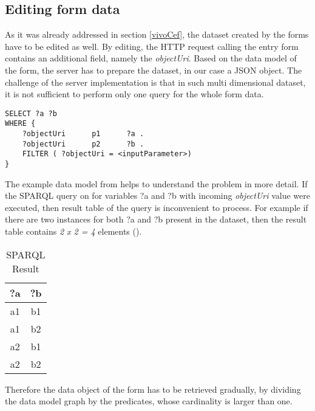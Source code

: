 \subsection{Editing form data}
	
As it was already addressed in section \ref{vivoCef}, the dataset created by the forms have to be edited as well. By editing, the HTTP request calling the entry form contains an additional field, namely the \textit{objectUri}. Based on the data model of the form, the server has to prepare the dataset, in our case a JSON object. The challenge of the server implementation is that in such multi dimensional dataset, it is not sufficient to perform only one query for the whole form data.


\begin{lstlisting}[captionpos=b, caption=SPARQL query for the form data, label={sparqlExisting},
basicstyle=\footnotesize,frame=single]
SELECT ?a ?b
WHERE {
	?objectUri		p1		?a .
	?objectUri		p2		?b .
	FILTER ( ?objectUri = <inputParameter>)
}
\end{lstlisting}

The example data model from  helps to understand the problem in more detail. If the SPARQL query on  for variables ?a and ?b with incoming \textit{objectUri} value were executed, then result table of the query is inconvenient to process. For example if there are two instances for both ?a and ?b present in the dataset, then the result table contains \textit{2 x 2 = 4} elements ().

\begin{table}

	\begin{center}
		\begin{tabular}{||c | c||} 
			\hline
			?a & ?b  \\ [0.5ex] 
			\hline\hline
			a1 & b1 \\ 
			\hline
			a1 & b2 \\
			\hline
			a2 & b1 \\
			\hline
			a2 & b2 \\ [1ex] 
			\hline 
		\end{tabular}
	\end{center}
	\caption{SPARQL Result}  \label{sparqlResult}
\end{table}


Therefore the data object of the form has to be retrieved gradually, by dividing the data model graph by the predicates, whose cardinality is larger than one.

